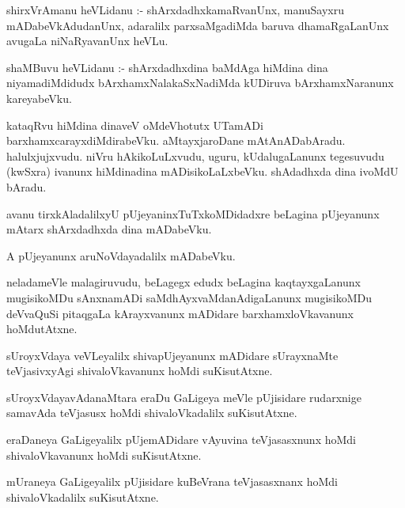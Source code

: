\documentclass{article}
\begin{document}
\begin{mn}
shirxVrAmanu  heVLidanu :- shArxdadhxkamaRvanUnx,  manuSayxru  mADabeVkAdudanUnx,  adaralilx  parxsaMgadiMda  baruva  dhamaRgaLanUnx  
avugaLa  niNaRyavanUnx  heVLu.
\end{mn}

\begin{mn}
shaMBuvu  heVLidanu :- shArxdadhxdina  baMdAga  hiMdina dina  niyamadiMdidudx  bArxhamxNalakaSxNadiMda  kUDiruva  bArxhamxNaranunx  kareyabeVku.
\end{mn}

\begin{mn}
kataqRvu  hiMdina  dinaveV  oMdeVhotutx  UTamADi  barxhamxcarayxdiMdirabeVku.  aMtayxjaroDane  mAtAnADabAradu.  halulxjujxvudu.  niVru 
hAkikoLuLxvudu,  uguru,  kUdalugaLanunx  tegesuvudu  (kwSxra)  ivanunx  hiMdinadina  mADisikoLaLxbeVku.  shAdadhxda  dina  ivoMdU  bAradu.
\end{mn}

\begin{mn}
avanu  tirxkAladalilxyU  pUjeyaninxTuTxkoMDidadxre  beLagina  pUjeyanunx  mAtarx  shArxdadhxda  dina  mADabeVku.
\end{mn}

\begin{mn}
A  pUjeyanunx  aruNoVdayadalilx  mADabeVku.
\end{mn}

\begin{mn}
neladameVle  malagiruvudu,  beLagegx  edudx  beLagina  kaqtayxgaLanunx  mugisikoMDu  sAnxnamADi  saMdhAyxvaMdanAdigaLanunx  
mugisikoMDu  deVvaQuSi  pitaqgaLa  kArayxvanunx  mADidare  barxhamxloVkavanunx  hoMdutAtxne.
\end{mn}

\begin{mn}
sUroyxVdaya  veVLeyalilx  shivapUjeyanunx  mADidare  sUrayxnaMte  teVjasivxyAgi  shivaloVkavanunx  hoMdi  suKisutAtxne.
\end{mn}

\begin{mn}
sUroyxVdayavAdanaMtara  eraDu  GaLigeya  meVle  pUjisidare  rudarxnige  samavAda  teVjasusx  hoMdi  shivaloVkadalilx  suKisutAtxne.
\end{mn}

\begin{mn}
eraDaneya  GaLigeyalilx  pUjemADidare  vAyuvina  teVjasasxnunx  hoMdi  shivaloVkavanunx  hoMdi  suKisutAtxne.
\end{mn}

\begin{mn}
mUraneya  GaLigeyalilx  pUjisidare  kuBeVrana  teVjasasxnanx  hoMdi  shivaloVkadalilx  suKisutAtxne.
\end{mn}
\end{document}
